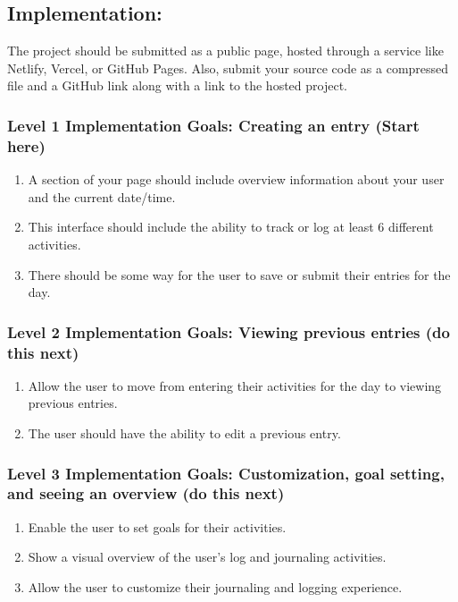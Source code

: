 \documentclass{article}
\begin{document}
\subsection*{Implementation:}
The project should be submitted as a public page, hosted through a service like Netlify, Vercel, or GitHub Pages. Also, submit your source code as a compressed file and a GitHub link along with a link to the hosted project.

\subsubsection*{Level 1 Implementation Goals: Creating an entry (Start here)}
\begin{enumerate}
    \item A section of your page should include overview information about your user and the current date/time.
    \item This interface should include the ability to track or log at least 6 different activities.
    \item There should be some way for the user to save or submit their entries for the day.
\end{enumerate}

\subsubsection*{Level 2 Implementation Goals: Viewing previous entries (do this next)}
\begin{enumerate}
    \item Allow the user to move from entering their activities for the day to viewing previous entries.
    \item The user should have the ability to edit a previous entry.
\end{enumerate}

\subsubsection*{Level 3 Implementation Goals: Customization, goal setting, and seeing an overview (do this next)}
\begin{enumerate}
    \item Enable the user to set goals for their activities.
    \item Show a visual overview of the user's log and journaling activities.
    \item Allow the user to customize their journaling and logging experience.
\end{enumerate}
\end{document}
